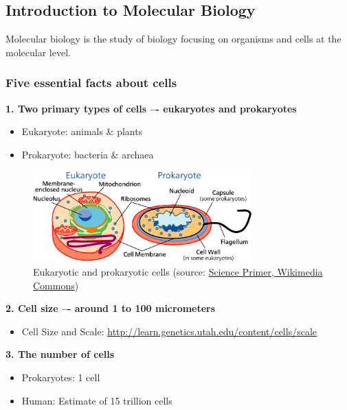 %
%

%
%
\subsection{Introduction to Molecular Biology}
Molecular biology is the study of biology focusing on organisms and cells at the molecular level.

%
%
\subsubsection*{Five essential facts about cells}

\textbf{1. Two primary types of cells –- eukaryotes and prokaryotes}
\begin{itemize}
\item Eukaryote: animals \& plants
\item Prokaryote: bacteria \& archaea
\end{itemize}
\begin{figure}[H]
  \centering
      \includegraphics[width=0.75\textwidth]{fig01/prokaryote_and_eukaryote_cells.png}
  \caption{Eukaryotic and prokaryotic cells (source: \href{https://commons.wikimedia.org/wiki/File:Celltypes.svg}{Science Primer, Wikimedia Commons})}
\end{figure}

\noindent \textbf{2. Cell size –- around 1 to 100 micrometers}
\begin{itemize}
\item Cell Size and Scale: \url{http://learn.genetics.utah.edu/content/cells/scale}
\end{itemize}
\medskip  

\noindent \textbf{3. The number of cells}
\begin{itemize}
\item Prokaryotes: 1 cell
\item Human:  Estimate of 15 trillion cells
\end{itemize}
\medskip 

